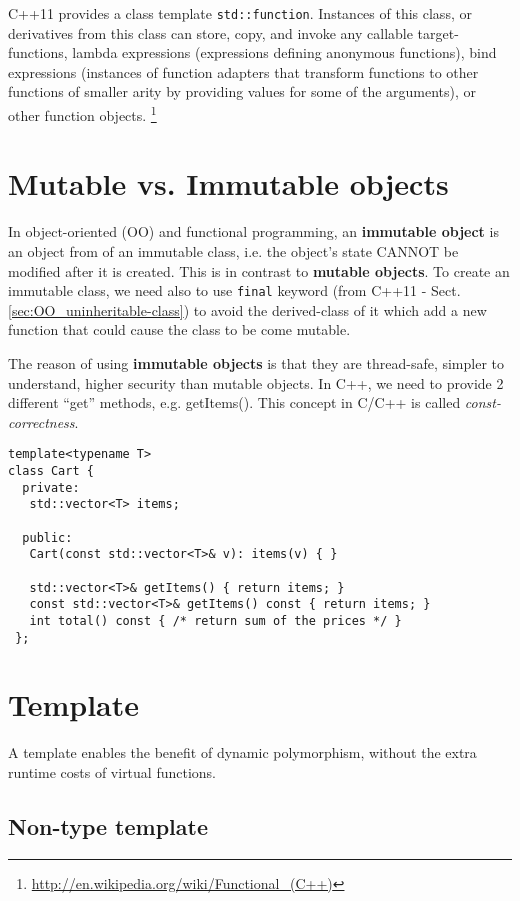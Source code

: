 C++11 provides a class template \verb!std::function!. Instances of this class,
or derivatives from this class can store, copy, and invoke any callable
target-functions, lambda expressions (expressions defining anonymous functions),
bind expressions (instances of function adapters that transform functions to
other functions of smaller arity by providing values for some of the arguments),
or other function objects. 
\footnote{\url{http://en.wikipedia.org/wiki/Functional_(C++)}}

\section{Mutable vs. Immutable objects}
\label{sec:OO_immutable-mutable}

In object-oriented (OO) and functional programming, an {\bf immutable object} is
an object from of an immutable class, i.e. the object's state CANNOT be modified
after it is created. This is in contrast to {\bf mutable objects}. To create an
immutable class, we need also to use \verb!final! keyword (from C++11 -
Sect.\ref{sec:OO_uninheritable-class}) to avoid the derived-class of it which
add a new function that could cause the class to be come mutable.

The reason of using {\bf immutable objects} is that they are thread-safe,
simpler to understand, higher security than mutable objects. In C++, we need to
provide 2 different ``get'' methods, e.g. getItems(). This concept in C/C++ is
called {\it const-correctness}.
\begin{verbatim}
template<typename T>
class Cart {
  private:
   std::vector<T> items;
 
  public:
   Cart(const std::vector<T>& v): items(v) { }
 
   std::vector<T>& getItems() { return items; }
   const std::vector<T>& getItems() const { return items; }
   int total() const { /* return sum of the prices */ }
 };
\end{verbatim}

\section{Template}
\label{sec:templat-C++}

A template enables the benefit of dynamic polymorphism, without the extra runtime costs of virtual functions.

\subsection{Non-type template}

